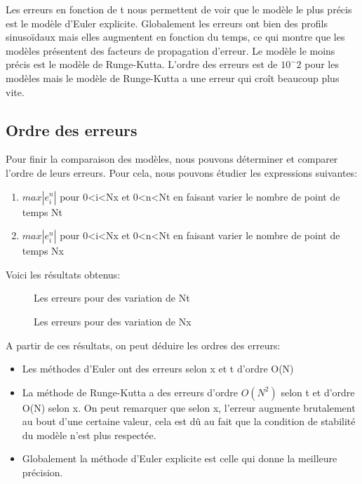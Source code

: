 Les erreurs en fonction de t nous permettent de voir que le modèle le plus précis est le modèle d'Euler explicite.
\newline
Globalement les erreurs ont bien des profils sinusoïdaux mais elles augmentent en fonction du temps, ce qui montre que les modèles présentent des facteurs de propagation d'erreur.
Le modèle le moins précis est le modèle de Runge-Kutta.
\newline
L'ordre des erreurs est de $10^-2$ pour les modèles mais le modèle de Runge-Kutta a une erreur qui croît beaucoup plus vite.

\vspace{1cm}
\subsection{Ordre des erreurs}
Pour finir la comparaison des modèles, nous pouvons déterminer et comparer l'ordre de leurs erreurs.
Pour cela, nous pouvons étudier les expressions suivantes:
\begin{enumerate}
    \item $max|e^n_{i}|$ pour 0<i<Nx et 0<n<Nt en faisant varier le nombre de point de temps Nt
    \item $max|e^n_{i}|$ pour 0<i<Nx et 0<n<Nt en faisant varier le nombre de point de temps Nx
\end{enumerate}

Voici les résultats obtenus:

\begin{figure}[H]
\begin{center}
\centering{}
\caption{Les erreurs pour des variation de Nt\label{fig1}}
\end{center}
\end{figure}

\begin{figure}[H]
\begin{center}
\centering{}
\caption{Les erreurs pour des variation de Nx\label{fig1}}
\end{center}
\end{figure}

A partir de ces résultats, on peut déduire les ordres des erreurs:
\begin{itemize}
    \item Les méthodes d'Euler ont des erreurs selon x et t d'ordre O(N)
    \item La méthode de Runge-Kutta a des erreurs  d'ordre $O(N^2)$ selon t et d'ordre O(N) selon x. On peut remarquer que selon x, l'erreur augmente brutalement au bout d'une certaine valeur, cela est dû au fait que la condition de stabilité du modèle n'est plus respectée.
    \item Globalement la méthode d'Euler explicite est celle qui donne la meilleure précision.
\end{itemize}


